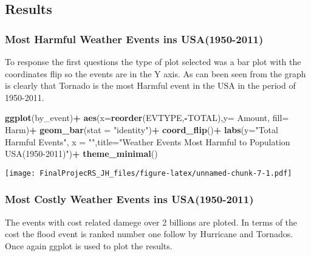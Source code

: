 \documentclass[]{article}
\newenvironment{Shaded}{\begin{snugshade}}{\end{snugshade}}
\newcommand{\KeywordTok}[1]{\textcolor[rgb]{0.13,0.29,0.53}{\textbf{#1}}}
\newcommand{\DataTypeTok}[1]{\textcolor[rgb]{0.13,0.29,0.53}{#1}}
\newcommand{\StringTok}[1]{\textcolor[rgb]{0.31,0.60,0.02}{#1}}
\newcommand{\OperatorTok}[1]{\textcolor[rgb]{0.81,0.36,0.00}{\textbf{#1}}}
\newcommand{\NormalTok}[1]{#1}
\begin{document}
\subsection{Results}\label{results}

\subsubsection{Most Harmful Weather Events ins
USA(1950-2011)}\label{most-harmful-weather-events-ins-usa1950-2011}

To response the first questions the type of plot selected was a bar plot
with the coordinates flip so the events are in the Y axis. As can been
seen from the graph is clearly that Tornado is the most Harmful event in
the USA in the period of 1950-2011.

\begin{Shaded}
\begin{Highlighting}[]
\KeywordTok{ggplot}\NormalTok{(by_event)}\OperatorTok{+}
\StringTok{  }\KeywordTok{aes}\NormalTok{(}\DataTypeTok{x=}\KeywordTok{reorder}\NormalTok{(EVTYPE,}\OperatorTok{-}\NormalTok{TOTAL),}\DataTypeTok{y=}\NormalTok{ Amount, }\DataTypeTok{fill=}\NormalTok{ Harm)}\OperatorTok{+}
\StringTok{  }\KeywordTok{geom_bar}\NormalTok{(}\DataTypeTok{stat =} \StringTok{"identity"}\NormalTok{)}\OperatorTok{+}
\StringTok{  }\KeywordTok{coord_flip}\NormalTok{()}\OperatorTok{+}
\StringTok{  }\KeywordTok{labs}\NormalTok{(}\DataTypeTok{y=}\StringTok{"Total Harmful Events"}\NormalTok{, }\DataTypeTok{x =} \StringTok{""}\NormalTok{,}\DataTypeTok{title=}\StringTok{"Weather Events Most Harmful to Population USA(1950-2011)"}\NormalTok{)}\OperatorTok{+}
\StringTok{  }\KeywordTok{theme_minimal}\NormalTok{()}
\end{Highlighting}
\end{Shaded}

\texttt{[image: FinalProjecRS\_JH\_files/figure-latex/unnamed-chunk-7-1.pdf]}

\subsubsection{Most Costly Weather Events ins
USA(1950-2011)}\label{most-costly-weather-events-ins-usa1950-2011}

The events with cost related damege over 2 billions are ploted. In terms
of the cost the flood event is ranked number one follow by Hurricane and
Tornados. Once again ggplot is used to plot the results.
\end{document}
